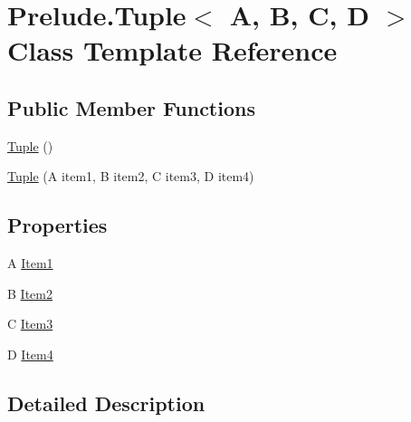 \hypertarget{class_prelude_1_1_tuple_3_01_a_00_01_b_00_01_c_00_01_d_01_4}{\section{Prelude.\+Tuple$<$ A, B, C, D $>$ Class Template Reference}
\label{class_prelude_1_1_tuple_3_01_a_00_01_b_00_01_c_00_01_d_01_4}
}
\subsection*{Public Member Functions}
\begin{DoxyCompactItemize}
\item 
\hyperlink{class_prelude_1_1_tuple_3_01_a_00_01_b_00_01_c_00_01_d_01_4_afa9557bc02439e94f38fa3fdf0fbab60}{Tuple} ()
\item 
\hyperlink{class_prelude_1_1_tuple_3_01_a_00_01_b_00_01_c_00_01_d_01_4_a257d2bf97c092f50e8172bad776ea20a}{Tuple} (A item1, B item2, C item3, D item4)
\end{DoxyCompactItemize}
\subsection*{Properties}
\begin{DoxyCompactItemize}
\item 
A \hyperlink{class_prelude_1_1_tuple_3_01_a_00_01_b_00_01_c_00_01_d_01_4_a183ede30f0d50cf9fd8a84bd0ea818b3}{Item1}
\item 
B \hyperlink{class_prelude_1_1_tuple_3_01_a_00_01_b_00_01_c_00_01_d_01_4_aa9658cf3058c27fcf525039f679a090c}{Item2}
\item 
C \hyperlink{class_prelude_1_1_tuple_3_01_a_00_01_b_00_01_c_00_01_d_01_4_aef958fbfd5894e205d2b57c89fa37608}{Item3}
\item 
D \hyperlink{class_prelude_1_1_tuple_3_01_a_00_01_b_00_01_c_00_01_d_01_4_aef96d06913b5c331aa2366cfcf237e0c}{Item4}
\end{DoxyCompactItemize}


\subsection{Detailed Description}


